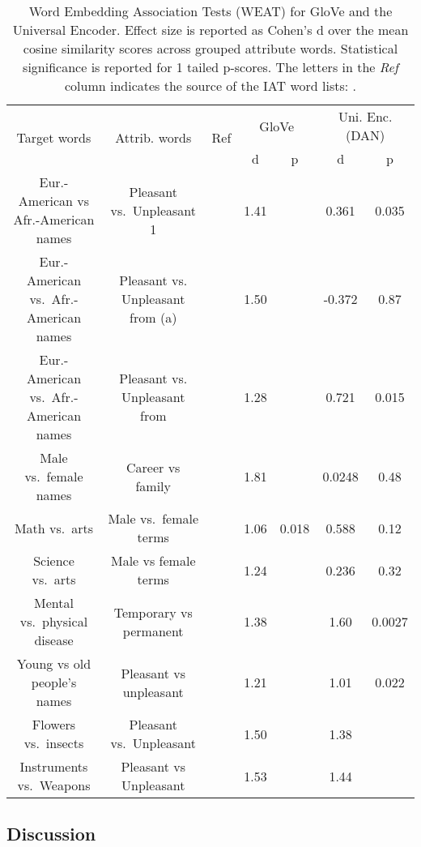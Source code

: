 \documentclass[11pt,a4paper]{article}
\begin{document}
\begin{table*}[ht!]
\footnotesize
\begin{center}

\begin{tabular}{|c|c|c|c|c|c|c|}
\hline
\multirow{2}{*}{Target words} & \multirow{2}{*}{Attrib. words} & \multirow{2}{*}{Ref} &
  \multicolumn{2}{|c|}{GloVe} &
  \multicolumn{2}{|c|}{ Uni. Enc. (DAN) } \\\cline{4-7}
  & & & d & p & d & p \\
\hline
Eur.-American
vs Afr.-American
names & Pleasant vs.\ 
Unpleasant 1 &  & 1.41 &  & 0.361 & 0.035 \\
\hline
Eur.-American
vs.\ Afr.-American
names & Pleasant vs.
Unpleasant from (a) &  & 1.50 &  & -0.372 & 0.87 \\
\hline
Eur.-American
vs.\ Afr.-American
names & Pleasant vs.
Unpleasant from  &  & 1.28 &  & 0.721 & 0.015 \\
\hline
Male vs.\ female
names & Career vs
family &  & 1.81 &  & 0.0248 & 0.48 \\
\hline
Math vs.\ arts &
Male vs.\
female terms &  & 1.06 & 0.018 & 0.588 & 0.12 \\
\hline
Science vs.\ arts & Male vs
female terms &  & 1.24 &  & 0.236 & 0.32 \\
\hline
Mental vs.\
physical disease & Temporary vs
permanent &  & 1.38 &  & 1.60 & 0.0027 \\
\hline
Young vs old
people’s names & Pleasant vs
unpleasant &  & 1.21 &  & 1.01 & 0.022 \\
\hline
\hline
Flowers vs.\
insects & 
Pleasant vs.\ Unpleasant &  & 1.50 &  & 1.38 &  \\
\hline
Instruments vs.\ Weapons &
Pleasant vs
Unpleasant &  & 1.53 &  & 1.44 &   \\ 
\hline
\end{tabular}
\end{center}
\caption{Word Embedding Association Tests (WEAT) for GloVe and the Universal Encoder. Effect size is reported as Cohen's d over the mean cosine similarity scores across grouped attribute words. Statistical significance is reported for 1 tailed p-scores. The letters in the \emph{Ref} column indicates the source of the IAT word lists:          .}
\label{tab:caliskancomp}
\end{table*}



\subsection{Discussion}
\end{document}
